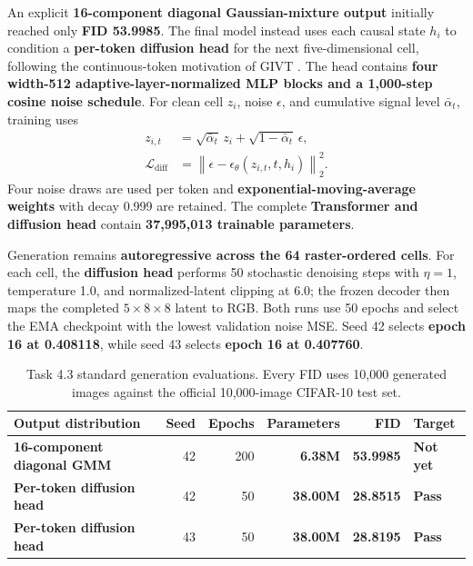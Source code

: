 \documentclass[11pt]{article}
\newcommand{\pass}{\textcolor{codegreen}{\textbf{Pass}}}
\newcommand{\notpass}{\textcolor{red!70!black}{\textbf{Not yet}}}
\newcommand{\keydata}[1]{\textbf{#1}}
\newcommand{\keyarch}[1]{\textcolor{codeblue}{\textbf{#1}}}
\begin{document}
An explicit \keyarch{16-component diagonal Gaussian-mixture output} initially reached only \keydata{FID 53.9985}. The final model instead uses each causal state $h_i$ to condition a \keyarch{per-token diffusion head} for the next five-dimensional cell, following the continuous-token motivation of GIVT \cite{tschannen2024givt}. The head contains \keyarch{four width-512 adaptive-layer-normalized MLP blocks and a 1,000-step cosine noise schedule}. For clean cell $z_i$, noise $\epsilon$, and cumulative signal level $\bar\alpha_t$, training uses
\begin{align}
 z_{i,t} &= \sqrt{\bar\alpha_t}\,z_i+\sqrt{1-\bar\alpha_t}\,\epsilon, \\
 \mathcal{L}_{\mathrm{diff}} &= \left\|\epsilon-\epsilon_\theta(z_{i,t},t,h_i)\right\|_2^2.
\end{align}
Four noise draws are used per token and \keyarch{exponential-moving-average weights} with decay 0.999 are retained. The complete \keyarch{Transformer and diffusion head} contain \keydata{37,995,013 trainable parameters}.

Generation remains \keyarch{autoregressive across the 64 raster-ordered cells}. For each cell, the \keyarch{diffusion head} performs 50 stochastic denoising steps with $\eta=1$, temperature 1.0, and normalized-latent clipping at 6.0; the frozen decoder then maps the completed $5\times8\times8$ latent to RGB. Both runs use 50 epochs and select the EMA checkpoint with the lowest validation noise MSE. Seed 42 selects \keydata{epoch 16 at 0.408118}, while seed 43 selects \keydata{epoch 16 at 0.407760}.

\begin{table}[H]
\centering
\caption{Task 4.3 standard generation evaluations. Every FID uses 10,000 generated images against the official 10,000-image CIFAR-10 test set.}
\begin{tabularx}{\textwidth}{Xrrrrl}
\toprule
Output distribution & Seed & Epochs & Parameters & FID & Target \\
\midrule
\keyarch{16-component diagonal GMM} & 42 & 200 & \keydata{6.38M} & \keydata{53.9985} & \notpass \\
\keyarch{Per-token diffusion head} & 42 & 50 & \keydata{38.00M} & \keydata{28.8515} & \pass \\
\keyarch{Per-token diffusion head} & 43 & 50 & \keydata{38.00M} & \keydata{28.8195} & \pass \\
\bottomrule
\end{tabularx}
\end{table}
\end{document}
